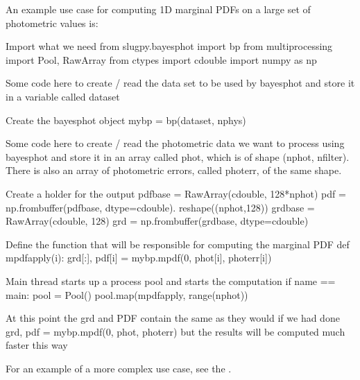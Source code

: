 \documentclass[letterpaper,10pt,english]{sphinxmanual}
\begin{document}
An example use case for computing 1D marginal PDFs on a large set of photometric values is:

\begin{sphinxVerbatim}[commandchars=\\\{\}]
\PYGZsh{} Import what we need
from slugpy.bayesphot import bp
from multiprocessing import Pool, RawArray
from ctypes import c\PYGZus{}double
import numpy as np

\PYGZsh{} Some code here to create / read the data set to be used by
\PYGZsh{} bayesphot and store it in a variable called dataset

\PYGZsh{} Create the bayesphot object
my\PYGZus{}bp = bp(dataset, nphys)

\PYGZsh{} Some code here to create / read the photometric data we want to
\PYGZsh{} process using bayesphot and store it in an array called phot,
\PYGZsh{} which is of shape (nphot, nfilter). There is also an array of
\PYGZsh{} photometric errors, called photerr, of the same shape.

\PYGZsh{} Create a holder for the output
pdf\PYGZus{}base = RawArray(c\PYGZus{}double, 128*nphot)
pdf = np.frombuffer(pdf\PYGZus{}base, dtype=c\PYGZus{}double). \PYGZbs{}
      reshape((nphot,128))
grd\PYGZus{}base = RawArray(c\PYGZus{}double, 128)
grd = np.frombuffer(grd\PYGZus{}base, dtype=c\PYGZus{}double)

\PYGZsh{} Define the function that will be responsible for computing the
\PYGZsh{} marginal PDF
def mpdf\PYGZus{}apply(i):
    grd[:], pdf[i] = my\PYGZus{}bp.mpdf(0, phot[i], photerr[i])

\PYGZsh{} Main thread starts up a process pool and starts the computation
if \PYGZus{}\PYGZus{}name\PYGZus{}\PYGZus{} == \PYGZsq{}\PYGZus{}\PYGZus{}main\PYGZus{}\PYGZus{}\PYGZsq{}:
    pool = Pool()
    pool.map(mpdf\PYGZus{}apply, range(nphot))

    \PYGZsh{} At this point the grd and PDF contain the same as they would
    \PYGZsh{} if we had done
    \PYGZsh{}     grd, pdf = my\PYGZus{}bp.mpdf(0, phot, photerr)
    \PYGZsh{} but the results will be computed much faster this way
\end{sphinxVerbatim}

For an example of a more complex use case, see the .
\end{document}
